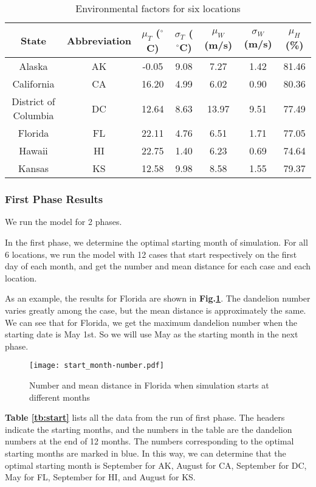 \documentclass[12pt]{article}
\begin{document}
			{
				\fontsize{10}{14}\selectfont
				{
					\begin{longtable}{ccccccc}
						\caption{Environmental factors for six locations}
						\label{tb:locs}\\
						\toprule
						State&Abbreviation&$\mu_T$ ($^\circ$C)&$\sigma_T$ ($^\circ$C)&$\mu_W$ (m/s)&$\sigma_W$ (m/s)&$\mu_H$ (\%)\\
						\toprule
						Alaska&AK&-0.05&9.08&7.27&1.42&81.46\\
						California&CA&16.20&4.99&6.02&0.90&80.36\\
						District of Columbia&DC&12.64&8.63&13.97&9.51&77.49\\
						Florida&FL&22.11&4.76&6.51&1.71&77.05\\
						Hawaii&HI&22.75&1.40&6.23&0.69&74.64\\
						Kansas&KS&12.58&9.98&8.58&1.55&79.37\\
						\bottomrule
					\end{longtable}
				}
			}
			\newpage
			
		\subsubsection{First Phase Results}	
			We run the model for 2 phases.
			
			In the first phase, we determine the optimal starting month of simulation.  For all 6 locations, we run the model with 12 cases that start respectively on the first day of each month, and get the number and mean distance for each case and each location.
			
			As an example, the results for Florida are shown in \textbf{Fig.\ref{fig:start}}.  The dandelion number varies greatly among the case, but the mean distance is approximately the same.  We can see that for Florida, we get the maximum dandelion number when the starting date is May 1st.  So we will use May as the starting month in the next phase.
			
			\begin{figure}[htbp]
				\centering
				\texttt{[image: start\_month-number.pdf]}
				\caption{Number and mean distance in Florida when simulation starts at different months}
				\label{fig:start}
			\end{figure}
			
			\textbf{Table \ref{tb:start}} lists all the data from the run of first phase.  The headers indicate the starting months, and the numbers in the table are the dandelion numbers at the end of 12 months.  The numbers corresponding to the optimal starting months are marked in blue.  In this way, we can determine that the optimal starting month is September for AK, August for CA, September for DC, May for FL, September for HI, and August for KS.
			
\end{document}

